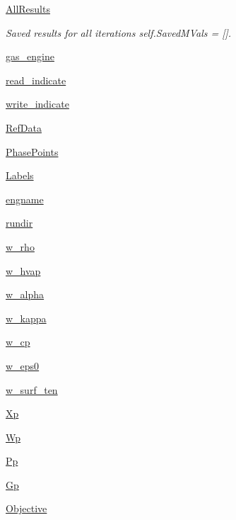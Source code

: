 \begin{DoxyCompactItemize}
\hyperlink{classsrc_1_1liquid_1_1Liquid_aff804d628027f3d20892fbe5ef0452f2}{All\+Results}
\begin{DoxyCompactList}\small\item\em Saved results for all iterations self.\+Saved\+M\+Vals = \mbox{[}\mbox{]}. \end{DoxyCompactList}\item 
\hyperlink{classsrc_1_1liquid_1_1Liquid_a067dcffe71bddcc374dc8619d529062f}{gas\+\_\+engine}
\item 
\hyperlink{classsrc_1_1liquid_1_1Liquid_afc6a5b1380c9fe67d0483a54c02487c5}{read\+\_\+indicate}
\item 
\hyperlink{classsrc_1_1liquid_1_1Liquid_a74646db7c89f4f7f07578e0840f182b0}{write\+\_\+indicate}
\item 
\hyperlink{classsrc_1_1liquid_1_1Liquid_ade287efb41717feefeb244c4113163f8}{Ref\+Data}
\item 
\hyperlink{classsrc_1_1liquid_1_1Liquid_acd631b2d731a2c0fadaf82c1a134df79}{Phase\+Points}
\item 
\hyperlink{classsrc_1_1liquid_1_1Liquid_a303043e31dfe693950a2e028bbcd727e}{Labels}
\item 
\hyperlink{classsrc_1_1liquid_1_1Liquid_ac2028906051f1ba08ec748acffa8aa7b}{engname}
\item 
\hyperlink{classsrc_1_1liquid_1_1Liquid_af87eed064ec6048a40baeef234c46639}{rundir}
\item 
\hyperlink{classsrc_1_1liquid_1_1Liquid_a1c430d62e8736ae276b7bcb3c5e48af5}{w\+\_\+rho}
\item 
\hyperlink{classsrc_1_1liquid_1_1Liquid_ad0c30b119ee7502f3288131a0ff79219}{w\+\_\+hvap}
\item 
\hyperlink{classsrc_1_1liquid_1_1Liquid_acc59dd087898dc187bf5067e735e9297}{w\+\_\+alpha}
\item 
\hyperlink{classsrc_1_1liquid_1_1Liquid_a8681a1168945b752c37877249a99cb01}{w\+\_\+kappa}
\item 
\hyperlink{classsrc_1_1liquid_1_1Liquid_a6f95bb37f323d05d597f4341cd15f221}{w\+\_\+cp}
\item 
\hyperlink{classsrc_1_1liquid_1_1Liquid_a3bdeef04fb48f2a34b7f7a8844d8d3a8}{w\+\_\+eps0}
\item 
\hyperlink{classsrc_1_1liquid_1_1Liquid_aab7d8dd8039e6d4898dbfbbdaf5ac034}{w\+\_\+surf\+\_\+ten}
\item 
\hyperlink{classsrc_1_1liquid_1_1Liquid_ae2b753e0fc7b02a275cc45bccce2419a}{Xp}
\item 
\hyperlink{classsrc_1_1liquid_1_1Liquid_a71c4080be710cf3f450ce618340f54f2}{Wp}
\item 
\hyperlink{classsrc_1_1liquid_1_1Liquid_aa1587611e32e765ed6552c044d23b8ca}{Pp}
\item 
\hyperlink{classsrc_1_1liquid_1_1Liquid_a593cab1d5e4ebe99d3e4f0dc8004258a}{Gp}
\item 
\hyperlink{classsrc_1_1liquid_1_1Liquid_afa4318bb1f833e5891262e3814408c0b}{Objective}
\end{DoxyCompactItemize}


